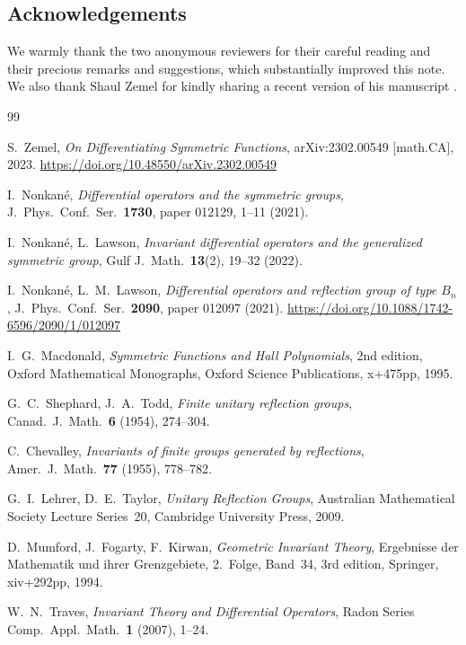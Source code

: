 \documentclass[10pt,a4paper]{amsart}
\begin{document}
\subsection*{Acknowledgements}

We warmly thank the two anonymous reviewers for their careful reading and their precious remarks and suggestions, which substantially improved this note. We also thank Shaul Zemel for kindly sharing a recent version of his manuscript \cite{Ze}.

\begin{thebibliography}{99}

 S.\ Zemel, \emph{On Differentiating Symmetric Functions}, arXiv:2302.00549 [math.CA], 2023. \url{https://doi.org/10.48550/arXiv.2302.00549}

 I.\ Nonkané, \emph{Differential operators and the symmetric groups}, J.\ Phys.\ Conf.\ Ser.\ \textbf{1730}, paper 012129, 1--11 (2021).

 I.\ Nonkané, L.\ Lawson, \emph{Invariant differential operators and the generalized symmetric group}, Gulf J.\ Math.\ \textbf{13}(2), 19--32 (2022).

 I.\ Nonkané, L.\ M.\ Lawson, \emph{Differential operators and reflection group of type $B_n$}, J.\ Phys.\ Conf.\ Ser.\ \textbf{2090}, paper 012097 (2021). \url{https://doi.org/10.1088/1742-6596/2090/1/012097}

 I.\ G.\ Macdonald, \emph{Symmetric Functions and Hall Polynomials}, 2nd edition, Oxford Mathematical Monographs, Oxford Science Publications, x+475pp, 1995.

 G.\ C.\ Shephard, J.\ A.\ Todd, \emph{Finite unitary reflection groups}, Canad.\ J.\ Math.\ \textbf{6} (1954), 274--304.

 C.\ Chevalley, \emph{Invariants of finite groups generated by reflections}, Amer.\ J.\ Math.\ \textbf{77} (1955), 778--782.

 G.\ I.\ Lehrer, D.\ E.\ Taylor, \emph{Unitary Reflection Groups}, Australian Mathematical Society Lecture Series~20, Cambridge University Press, 2009.

 D.\ Mumford, J.\ Fogarty, F.\ Kirwan, \emph{Geometric Invariant Theory}, Ergebnisse der Mathematik und ihrer Grenzgebiete, 2.\ Folge, Band~34, 3rd edition, Springer, xiv+292pp, 1994.

 W.\ N.\ Traves, \emph{Invariant Theory and Differential Operators}, Radon Series Comp.\ Appl.\ Math.\ \textbf{1} (2007), 1--24.


\end{thebibliography}
\end{document}
